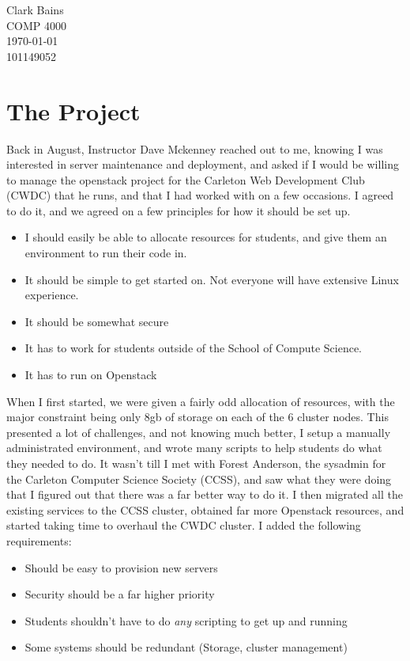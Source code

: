 \documentclass{article}
\begin{document}
\begin{center}
    {\Large Clark Bains}\\
    COMP 4000 \\
    \today \\
    101149052
\end{center}
\section{The Project}
Back in August, Instructor Dave Mckenney reached out to me, knowing I was interested in server maintenance and deployment, and asked if I would be willing to manage the openstack project for the Carleton Web Development Club (CWDC) that he runs, and that I had worked with on a few occasions. I agreed to do it, and we agreed on a few principles for how it should be set up.
\begin{itemize}
    \item I should easily be able to allocate resources for students, and give them an environment to run their code in.
    \item It should be simple to get started on. Not everyone will have extensive Linux experience.
    \item It should be somewhat secure
    \item It has to work for students outside of the School of Compute Science.
    \item It has to run on Openstack
\end{itemize}
When I first started, we were given a fairly odd allocation of resources, with the major constraint being only 8gb of storage on each of the 6 cluster nodes. This presented a lot of challenges, and not knowing much better, I setup a manually administrated environment, and wrote many scripts to help students do what they needed to do. It wasn't till I met with Forest Anderson, the sysadmin for the Carleton Computer Science Society (CCSS), and saw what they were doing that I figured out that there was a far better way to do it. I then migrated all the existing services to the CCSS cluster, obtained far more Openstack resources, and started taking time to overhaul the CWDC cluster. I added the following requirements:
\begin{itemize}
    \item Should be easy to provision new servers
    \item Security should be a far higher priority
    \item Students shouldn't have to do \emph{any} scripting to get up and running
    \item Some systems should be redundant (Storage, cluster management)
\end{itemize}
\end{document}
